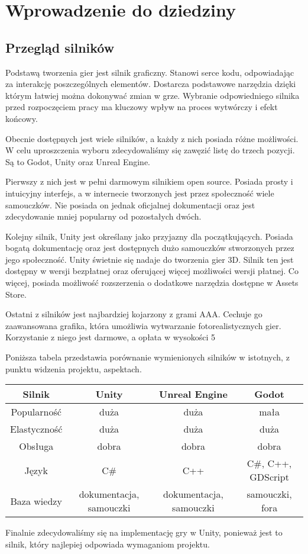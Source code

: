 \chapter{Wprowadzenie do dziedziny}\label{chap:field}

\section{Przegląd silników}
Podstawą tworzenia gier jest silnik graficzny. Stanowi serce kodu, odpowiadając za interakcję poszczególnych elementów. Dostarcza podstawowe narzędzia dzięki którym łatwiej można dokonywać zmian w grze. Wybranie odpowiedniego silnika przed rozpoczęciem pracy ma kluczowy wpływ na proces wytwórczy i efekt końcowy.

Obecnie dostępnych jest wiele silników, a każdy z nich posiada różne możliwości. W celu uproszczenia wyboru zdecydowaliśmy się zawęzić listę do trzech pozycji. Są to Godot, Unity oraz Unreal Engine.

Pierwszy z nich jest w pełni darmowym silnikiem open source. Posiada prosty i intuicyjny interfejs, a w internecie tworzonych jest przez społeczność wiele samouczków. Nie posiada on jednak oficjalnej dokumentacji oraz jest zdecydowanie mniej popularny od pozostałych dwóch.

Kolejny silnik, Unity jest określany jako przyjazny dla początkujących. Posiada bogatą dokumentację oraz jest dostępnych dużo samouczków stworzonych przez jego społeczność. Unity świetnie się nadaje do tworzenia gier 3D. Silnik ten jest dostępny w wersji bezpłatnej oraz oferującej więcej możliwości wersji płatnej. Co więcej, posiada możliwość rozszerzenia o dodatkowe narzędzia dostępne w Assets Store.

Ostatni z silników jest najbardziej kojarzony z grami AAA. Cechuje go zaawansowana grafika, która umożliwia wytwarzanie fotorealistycznych gier. Korzystanie z niego jest darmowe, a opłata w wysokości 5%

Poniższa tabela przedstawia porównanie wymienionych silników w istotnych, z punktu widzenia projektu, aspektach.

\begin{center}
\begin{tabular}{ |c||c|c|c| }
 \hline
 Silnik & Unity & Unreal Engine & Godot \\
 \hline \hline
 Popularność & duża & duża & mała \\
 \hline
 Elastyczność & duża & duża & duża \\
 \hline
 Obsługa & dobra & dobra & dobra \\
 \hline
 Język & C\# & C++ & C\#, C++, GDScript \\
 \hline
 Baza wiedzy & dokumentacja,  samouczki & dokumentacja, samouczki & samouczki, fora \\
 \hline
\end{tabular}
\end{center}

Finalnie zdecydowaliśmy się na implementację gry w Unity, ponieważ jest to silnik, który najlepiej odpowiada wymaganiom projektu.